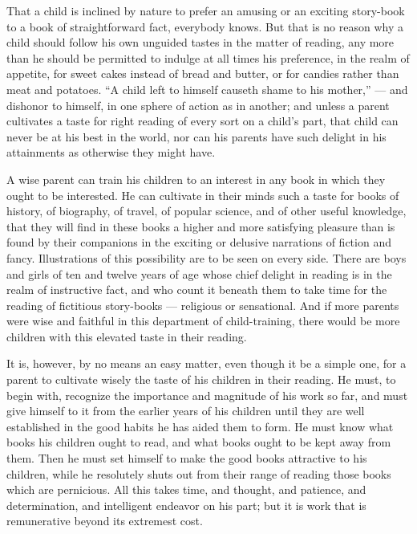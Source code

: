 \documentclass[
]{book}
\begin{document}
That a child is inclined by nature to prefer an amusing or an exciting story-book to a book of straightforward fact, everybody knows. But that is no reason why a child should follow his own unguided tastes in the matter of reading, any more than he should be permitted to indulge at all times his preference, in the realm of appetite, for sweet cakes instead of bread and butter, or for candies rather than meat and potatoes. ``A child left to himself causeth shame to his mother,'' --- and dishonor to himself, in one sphere of action as in another; and unless a parent cultivates a taste for right reading of every sort on a child's part, that child can never be at his best in the world, nor can his parents have such delight in his attainments as otherwise they might have.

A wise parent can train his children to an interest in any book in which they ought to be interested. He can cultivate in their minds such a taste for books of history, of biography, of travel, of popular science, and of other useful knowledge, that they will find in these books a higher and more satisfying pleasure than is found by their companions in the exciting or delusive narrations of fiction and fancy. Illustrations of this possibility are to be seen on every side. There are boys and girls of ten and twelve years of age whose chief delight in reading is in the realm of instructive fact, and who count it beneath them to take time for the reading of fictitious story-books --- religious or sensational. And if more parents were wise and faithful in this department of child-training, there would be more children with this elevated taste in their reading.

It is, however, by no means an easy matter, even though it be a simple one, for a parent to cultivate wisely the taste of his children in their reading. He must, to begin with, recognize the importance and magnitude of his work so far, and must give himself to it from the earlier years of his children until they are well established in the good habits he has aided them to form. He must know what books his children ought to read, and what books ought to be kept away from them. Then he must set himself to make the good books attractive to his children, while he resolutely shuts out from their range of reading those books which are pernicious. All this takes time, and thought, and patience, and determination, and intelligent endeavor on his part; but it is work that is remunerative beyond its extremest cost.
\end{document}
